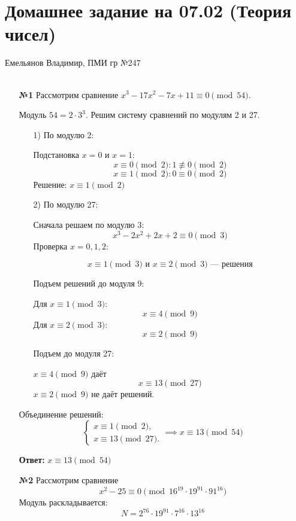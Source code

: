 \documentclass[a4paper]{article}
\begin{document}
\section*{Домашнее задание на 07.02 (Теория чисел)}
 {\large Емельянов Владимир, ПМИ гр №247}\\\\
\begin{enumerate}
    \item[\textbf{№1}]
    Рассмотрим сравнение \( x^3 - 17x^2 - 7x + 11 \equiv 0 \pmod{54} \).  

    Модуль \(54 = 2 \cdot 3^3\). Решим систему сравнений по модулям 2 и 27.
    \begin{enumerate}
        \item[1)]По модулю 2:
        
        Подстановка \(x = 0\) и \(x = 1\):  
        \[x \equiv 0 \pmod{2}: 1 \not\equiv 0 \pmod{2}\]
        \[x \equiv 1 \pmod{2}: 0 \equiv 0 \pmod{2}\]
        Решение: \(x \equiv 1 \pmod{2}\)

        \item[2)]По модулю 27:  
        
        Сначала решаем по модулю 3:  
        \[x^3 - 2x^2 + 2x + 2 \equiv 0 \pmod{3}\]  
        Проверка \(x = 0, 1, 2\):  

        $$\text{\(x \equiv 1 \pmod{3}\) и \(x \equiv 2 \pmod{3}\) — решения}$$

        Подъем решений до модуля 9: 

        Для \(x \equiv 1 \pmod{3}\): 
        \[x \equiv 4 \pmod{9}\]  
        Для \(x \equiv 2 \pmod{3}\): 
        \[x \equiv 2 \pmod{9}\]  

        Подъем до модуля 27:  

        \(x \equiv 4 \pmod{9}\) даёт \[x \equiv 13 \pmod{27}\]
        \(x \equiv 2 \pmod{9}\) не даёт решений. 
    \end{enumerate}

    Объединение решений: 
    \[
    \begin{cases}
    x \equiv 1 \pmod{2}, \\
    x \equiv 13 \pmod{27}.
    \end{cases}
    \implies x \equiv 13 \pmod{54}\]  

    \textbf{Ответ: } $x \equiv 13 \pmod{54}$\\

    \item[\textbf{№2}]
    Рассмотрим сравнение 
    \[x^2 - 25 \equiv 0 \pmod{16^{19} \cdot 19^{91} \cdot 91^{16}}\] 
    Модуль раскладывается: 
    \[N = 2^{76} \cdot 19^{91} \cdot 7^{16} \cdot 13^{16}\] 
    

\end{enumerate}
\end{document}
